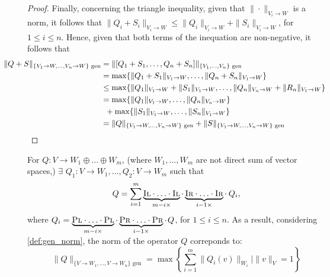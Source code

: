 \begin{proof}
  Finally, concerning the triangle inequality, given that $\|\cdot \|_{V_i \rightarrow W}$ is a norm, it follows that $\|Q_i + S_i\|_{V_i \rightarrow W} \leq \|Q_i\|_{V_i \rightarrow W} + \|S_i\|_{V_i \rightarrow W}$, for $1 \leq i \leq n$. Hence, given that both terms of the inequation are non-negative, it follows that
  \begin{align*}
   \hspace{-30pt} \|Q + S\|_{\{V_1\rightarrow W, \ldots, V_n\rightarrow W\} \text{ gen}} & = \|[Q_1 + S_1, \ldots, Q_n + S_n]\|_{\{V_1, \ldots, V_n\} \text{ gen}} \\
    & = \max \{\|Q_1 + S_1\|_{V_1 \rightarrow W}, \ldots, \|Q_n + S_n\|_{V_1 \rightarrow W}  \} \\
    & \leq \max \{\|Q_1\|_{V_1 \rightarrow W} + \|S_1\|_{V_1 \rightarrow W}, \ldots, \|Q_n\|_{V_n \rightarrow W} + \|R_n\|_{V_1 \rightarrow W}  \} \\
    & = \max \{\|Q_1\|_{V_1 \rightarrow W}, \ldots, \|Q_n\|_{V_n \rightarrow W}  \}  \\
    & \hspace{5pt} + \max \{\|S_1\|_{V_1 \rightarrow W}, \ldots, \|S_n\|_{V_1 \rightarrow W}  \} \\
    & = \|Q\|_{\{V_1\rightarrow W, \ldots, V_n\rightarrow W\} \text{ gen}} + \|S\|_{\{V_1\rightarrow W, \ldots, V_n\rightarrow W\} \text{ gen}}
  \end{align*}
\end {proof}




\vspace{5pt}


\begin{definition} \label{def:gen_norm_gen_inj}
  For $Q: V \rightarrow W_1 \oplus \ldots \oplus W_m$, (where  $W_1, \ldots, W_m$  are not direct sum of vector spaces,) $\exists$ $Q_1: V \rightarrow W_1, \ldots,Q_2: V \rightarrow W_m$ such that 
  $$Q = \sum_{i=1}^{m} \underbrace{\textsc{Il} \cdot \ldots \cdot \textsc{Il}}_{m-i \times } \cdot  \underbrace{\textsc{Ir} \cdot \ldots \cdot \textsc{Ir}}_{i-1 \times } \cdot  \hspace{2pt} Q_i,$$
   where $Q_i =  \underbrace{\textsc{Pl} \cdot \ldots \cdot \textsc{Pl}}_{m-i \times} \cdot \underbrace{\textsc{Pr} \cdot \ldots \cdot \textsc{Pr}}_{i-1 \times} \cdot \hspace{1pt} Q$, for $1 \leq i \leq n $. As a result, considering \autoref{def:gen_norm}, the norm of the operator $Q$ correponds to:
  \begin{equation}
    \|Q\|_{\{V \rightarrow W_1,\ldots ,V \rightarrow W_n\} \text{ gen}} = \max \left\{ \sum_{i=1}^{m}  \| Q_{i} (v)\|_{W_i}  \mid  \|v\|_{V} = 1 \right\}
  \end{equation}
\end{definition}

